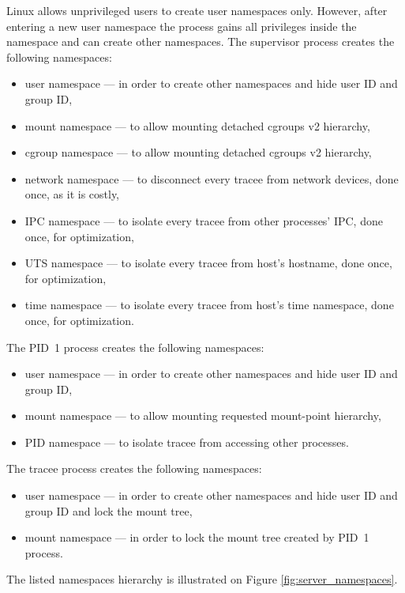 \documentclass[en]{pracamgr}
\begin{document}
Linux allows unprivileged users to create user namespaces only. However, after entering a new user namespace the process gains all privileges inside the namespace and can create other namespaces.
\newline
The supervisor process creates the following namespaces:
\begin{itemize}
    \item user namespace --- in order to create other namespaces and hide user ID and group ID,
    \item mount namespace --- to allow mounting detached cgroups v2 hierarchy,
    \item cgroup namespace --- to allow mounting detached cgroups v2 hierarchy,
    \item network namespace --- to disconnect every tracee from network devices, done once, as it is costly,
    \item IPC namespace --- to isolate every tracee from other processes' IPC, done once, for optimization,
    \item UTS namespace --- to isolate every tracee from host's hostname, done once, for optimization,
    \item time namespace --- to isolate every tracee from host's time namespace, done once, for optimization.
\end{itemize}
The PID~1 process creates the following namespaces:
\begin{itemize}
    \item user namespace --- in order to create other namespaces and hide user ID and group ID,
    \item mount namespace --- to allow mounting requested mount-point hierarchy,
    \item PID namespace --- to isolate tracee from accessing other processes.
\end{itemize}
The tracee process creates the following namespaces:
\begin{itemize}
    \item user namespace --- in order to create other namespaces and hide user ID and group ID and lock the mount tree,
    \item mount namespace --- in order to lock the mount tree created by PID~1 process.
\end{itemize}
The listed namespaces hierarchy is illustrated on Figure \ref{fig:server_namespaces}.
\end{document}
